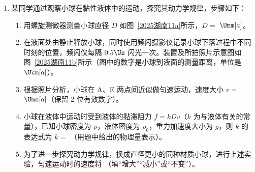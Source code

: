 \documentclass[\gkver]{gaokaozhenti}
\begin{document}
\begin{enumerate}
{B 与 C 碰撞过程动量守恒 $mv_{2}=6mv$

联立解得 $v=0.5v_{1}$。

爆炸后瞬间 A 的动能 $E_{kA}=\frac{1}{2}\cdot3m\cdot v_{1}^{2}$

D 的初动能 $E_{kD}=\frac{1}{2}\cdot6m\cdot(0.5v_{1})^{2}$

两者不相等，故 A 错误；

B．D 水平滑动过程中摩擦力做功为 $W_{\mathrm{f}}=-\mu\cdot6mg\cdot s_{1}=-\mu\cdot6mg\cdot\frac{h}{\mu}=-6mgh$

做平抛运动过程中重力做的功为 $W_{G}=6mgh$

故 D 从开始运动到落地瞬间合外力做功为 0，根据动能定理可知 D 的初动能与其落地时的动能相等，故 B 正确；

CD．D 物块平抛过程有 $h=\frac{1}{2}gt^{2}$，$s_{2}=v_{0}t$

联立可得 $v_{0}=s_{2}\sqrt{\frac{g}{2h}}$

D 水平滑动过程中根据动能定理有
$-6mgh=\frac{1}{2}\cdot6mv_{0}^{2}-\frac{1}{2}\cdot6mv^{2}$

化简得 $v^{2}=\frac{s_{2}^{2}g}{2h}+2gh$

弹药释放的能量完全转化为 A 和 B 的动能，则爆炸过程的能量为
$E=\frac{1}{2}\cdot3mv_{1}^{2}+\frac{1}{2}\cdot mv_{2}^{2}=24mv^{2}=24(\frac{s_{2}^{2}g}{2h}+2gh)=48mgh(1+\frac{s_{2}^{2}}{4h^{2}})$

故 C 错误，D 正确。

故选 BD。
}

\item
某同学通过观察小球在黏性液体中的运动，探究其动力学规律，步骤如下：
\begin{enumerate}
	\item
	用螺旋测微器测量小球直径 $D$ 如图~\ref{2025湖南11a}所示，$D=$  $\Umm[a]$。
	\item
	在液面处由静止释放小球，同时使用频闪摄影仪记录小球下落过程中不同时刻的位置，频闪仪每隔 $0.5 \Us$ 闪光一次。装置及所拍照片示意图如图~\ref{2025湖南11b}所示（图中的数字是小球到液面的测量距离，单位是 $\Ucm[a]$）。
	\item
	根据照片分析，小球在 A、E 两点间近似做匀速运动，速度大小 $v=$  $\Ums[a]$（保留 2 位有效数字）。
	\item
	小球在液体中运动时受到液体的黏滞阻力 $f=kDv$（$k$ 为与液体有关的常量），已知小球密度为 $\rho$，液体密度为 $\rho_{0}$，重力加速度大小为 $g$，则 $k$ 的表达式为 $k=$ （用题中给出的物理量表示）。
	\item
	为了进一步探究动力学规律，换成直径更小的同种材质小球，进行上述实验，匀速运动时的速度将 （填“增大”“减小”或“不变”）。
\end{enumerate}


\end{enumerate}
\end{document}

